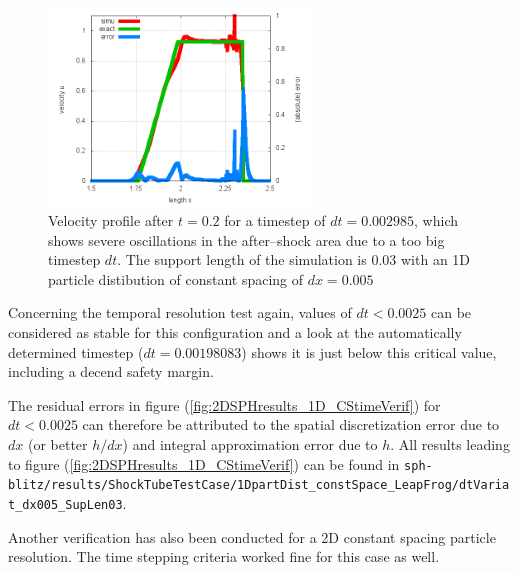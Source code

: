 \documentclass{report}
\begin{document}
\begin{figure}[!htbp]

\centering
\label{fig:2DSPHresults_dt_variat_oscillationU}
\includegraphics[width=7cm]{Graphics/results/ShockTube/1D_CS_LF_SD/dtVariat_dx005_SupLen03_dt03_Oscillations/Err_u00200000}
\caption[Velocity oscillations due to temporal instability]{Velocity profile after $t=0.2$ for a timestep of $dt=0.002985$, which shows severe oscillations in the after--shock area due to a too big timestep $dt$. The support length of the simulation is $0.03$ with an 1D particle distibution of constant spacing of $dx=0.005$ }

\end{figure}

Concerning the temporal resolution test again, values of $dt<0.0025$ can be considered as stable for this configuration and a look at the automatically determined timestep ($dt=0.00198083$) shows it is just below this critical value, including a decend safety margin.

The residual errors in figure (\ref{fig:2DSPHresults_1D_CStimeVerif}) for $dt<0.0025$ can therefore be attributed to the spatial discretization error due to $dx$ (or better $h/dx$) and integral approximation error due to $h$. All results leading to figure (\ref{fig:2DSPHresults_1D_CStimeVerif}) can be found in {\tt sph-blitz/results/ShockTubeTestCase/1DpartDist\_constSpace\_LeapFrog/dtVariat\_dx005\_SupLen03}.

Another verification has also been conducted for a 2D constant spacing particle resolution. The time stepping criteria worked fine for this case as well. 
\end{document}
